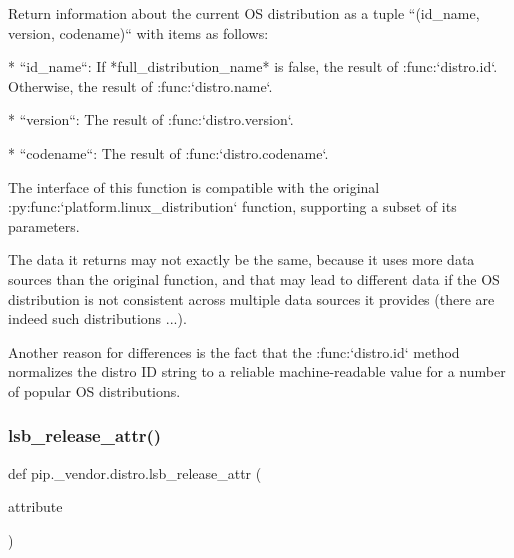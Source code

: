 \begin{DoxyVerb}Return information about the current OS distribution as a tuple
``(id_name, version, codename)`` with items as follows:

* ``id_name``:  If *full_distribution_name* is false, the result of
  :func:`distro.id`. Otherwise, the result of :func:`distro.name`.

* ``version``:  The result of :func:`distro.version`.

* ``codename``:  The result of :func:`distro.codename`.

The interface of this function is compatible with the original
:py:func:`platform.linux_distribution` function, supporting a subset of
its parameters.

The data it returns may not exactly be the same, because it uses more data
sources than the original function, and that may lead to different data if
the OS distribution is not consistent across multiple data sources it
provides (there are indeed such distributions ...).

Another reason for differences is the fact that the :func:`distro.id`
method normalizes the distro ID string to a reliable machine-readable value
for a number of popular OS distributions.
\end{DoxyVerb}
 \mbox{\label{namespacepip_1_1__vendor_1_1distro_a01483bf8f281c36eb9040b99df697ca8}} 
\subsubsection{\texorpdfstring{lsb\+\_\+release\+\_\+attr()}{lsb\_release\_attr()}}
{\footnotesize\ttfamily def pip.\+\_\+vendor.\+distro.\+lsb\+\_\+release\+\_\+attr (\begin{DoxyParamCaption}\item[{}]{attribute }\end{DoxyParamCaption})}

